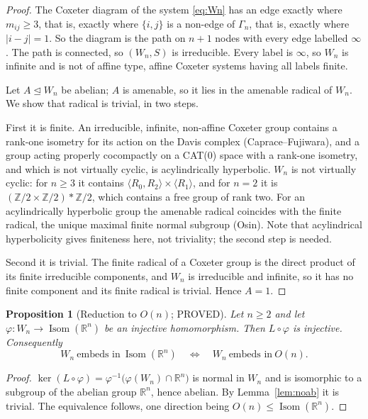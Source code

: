 \documentclass[11pt]{article}
\newtheorem{proposition}[theorem]{Proposition}
\theoremstyle{definition}
\theoremstyle{remark}
\theoremstyle{definition}
\newcommand{\Z}{\mathbb{Z}}
\newcommand{\R}{\mathbb{R}}
\newcommand{\Isom}{\operatorname{Isom}}
\begin{document}
\begin{proof}
The Coxeter diagram of the system \eqref{eq:Wn} has an edge exactly where $m_{ij}\ge3$, that is,
exactly where $\{i,j\}$ is a non-edge of $\Gamma_n$, that is, exactly where $|i-j|=1$. So the
diagram is the path on $n+1$ nodes with every edge labelled $\infty$. The path is connected,
so $(W_n,S)$ is irreducible. Every label is $\infty$, so $W_n$ is infinite and is not of affine
type, affine Coxeter systems having all labels finite.

Let $A\trianglelefteq W_n$ be abelian; $A$ is amenable, so it lies in the amenable radical of
$W_n$. We show that radical is trivial, in two steps.

First it is finite. An irreducible, infinite, non-affine Coxeter group contains a rank-one
isometry for its action on the Davis complex (Caprace--Fujiwara), and a group acting properly
cocompactly on a CAT(0) space with a rank-one isometry, and which is not virtually cyclic, is
acylindrically hyperbolic. $W_n$ is not virtually cyclic: for $n\ge3$ it contains
$\langle R_0,R_2\rangle\times\langle R_1\rangle$, and for $n=2$ it is
$(\Z/2\times\Z/2)\ast\Z/2$, which contains a free group of rank two. For an acylindrically
hyperbolic group the amenable radical coincides with the finite radical, the unique maximal
finite normal subgroup (Osin). Note that acylindrical hyperbolicity gives finiteness here, not
triviality; the second step is needed.

Second it is trivial. The finite radical of a Coxeter group is the direct product of its finite
irreducible components, and $W_n$ is irreducible and infinite, so it has no finite component and
its finite radical is trivial. Hence $A=1$.
\end{proof}

\begin{proposition}[Reduction to $O(n)$; PROVED]\label{prop:reduce}
Let $n\ge2$ and let $\varphi\colon W_n\to\Isom(\R^n)$ be an injective homomorphism. Then
$L\circ\varphi$ is injective. Consequently
\[
  W_n\ \text{embeds in}\ \Isom(\R^n)\quad\Longleftrightarrow\quad W_n\ \text{embeds in}\ O(n).
\]
\end{proposition}

\begin{proof}
$\ker(L\circ\varphi)=\varphi^{-1}\bigl(\varphi(W_n)\cap\R^n\bigr)$ is normal in $W_n$ and is
isomorphic to a subgroup of the abelian group $\R^n$, hence abelian. By Lemma~\ref{lem:noab} it is
trivial. The equivalence follows, one direction being $O(n)\le\Isom(\R^n)$.
\end{proof}
\end{document}
